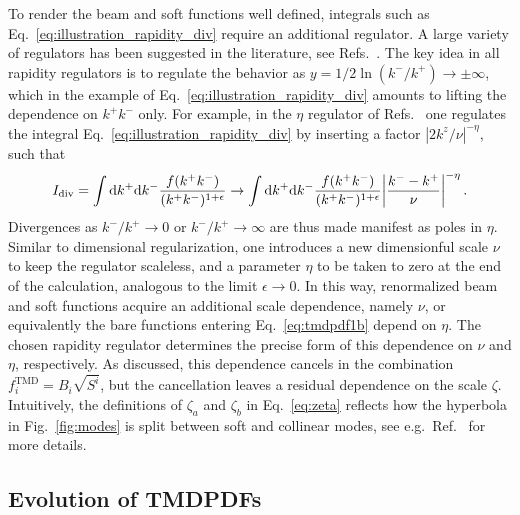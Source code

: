 \documentclass[11pt,a4paper]{article}
\DeclareRobustCommand{\eq}[1]{Eq.~\eqref{eq:#1}}
\DeclareRobustCommand{\fig}[1]{Fig.~\ref{fig:#1}}
\DeclareRobustCommand{\mycite}[1]{Ref.~\cite{#1}}
\DeclareRobustCommand{\mycites}[1]{Refs.~\cite{#1}}
\newcommand{\df}{\mathrm{d}}
\newcommand{\eps}{\epsilon}
\newcommand\TMD{\mathrm{TMD}}
\begin{document}
To render the beam and soft functions well defined, integrals such as \eq{illustration_rapidity_div} require an additional regulator. A large variety of regulators has been suggested in the literature, see \mycites{Collins:1981uk,Collins:1350496,Ji:2004wu,Beneke:2003pa, Chiu:2007yn, Becher:2011dz,Chiu:2011qc, Chiu:2012ir,Chiu:2009yx, GarciaEchevarria:2011rb,Li:2016axz,Ebert:2018gsn}.
The key idea in all rapidity regulators is to regulate the behavior as $y = 1/2 \ln(k^-/k^+) \to \pm \infty$,
which in the example of \eq{illustration_rapidity_div} amounts to lifting the dependence on $k^+ k^-$ only.
For example, in the $\eta$ regulator of \mycites{Chiu:2011qc, Chiu:2012ir} one regulates the integral \eq{illustration_rapidity_div} by inserting a factor $|2k^z/\nu|^{-\eta}$, such that
\begin{align} \label{eq:illustration_rapidity_div_2}
I_{\rm div} = \int \df k^+ \df k^- \frac{f(k^+ k^-)}{(k^+ k^-)^{1+\eps}}
 \to \int \df k^+ \df k^- \frac{f(k^+ k^-)}{(k^+ k^-)^{1+\eps}} \biggl|\frac{k^- - k^+}{\nu}\biggr|^{-\eta}
\,.\end{align}
Divergences as $k^-/k^+ \to 0$ or $k^-/k^+\to\infty$ are thus made manifest as poles in $\eta$.
Similar to dimensional regularization, one introduces a new dimensionful scale $\nu$ to keep the regulator scaleless,
and a parameter $\eta$ to be taken to zero at the end of the calculation, analogous to the limit $\eps\to0$.
In this way, renormalized beam and soft functions acquire an additional scale dependence, namely $\nu$,
or equivalently the bare functions entering \eq{tmdpdf1b} depend on $\eta$.
The chosen rapidity regulator determines the precise form of this dependence on $\nu$ and $\eta$, respectively.
As discussed, this dependence cancels in the combination $f_i^\TMD = B_i \sqrt{S^i}$,
but the cancellation leaves a residual dependence on the scale $\zeta$.
Intuitively, the definitions of $\zeta_a$ and $\zeta_b$ in \eq{zeta} reflects how the hyperbola in \fig{modes}
is split between soft and collinear modes, see e.g.\ \mycite{Echevarria:2012js} for more details.


\subsection{Evolution of TMDPDFs}
\label{sec:evolution}
\end{document}
